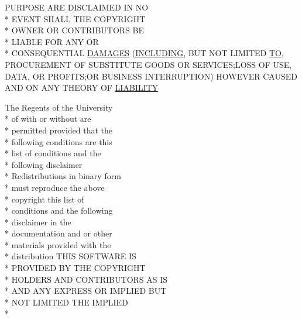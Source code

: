 \begin{DoxyCompactItemize}
P\+U\+R\+P\+O\+S\+E A\+R\+E D\+I\+S\+C\+L\+A\+I\+M\+E\+D I\+N N\+O \\*
E\+V\+E\+N\+T S\+H\+A\+L\+L T\+H\+E C\+O\+P\+Y\+R\+I\+G\+H\+T \\*
O\+W\+N\+E\+R O\+R C\+O\+N\+T\+R\+I\+B\+U\+T\+O\+R\+S B\+E \\*
L\+I\+A\+B\+L\+E F\+O\+R A\+N\+Y O\+R \\*
C\+O\+N\+S\+E\+Q\+U\+E\+N\+T\+I\+A\+L \hyperlink{_l_i_c_e_n_s_e_a71368e1362f00dad6d2fdb550f345070}{D\+A\+M\+A\+G\+E\+S} (\hyperlink{_l_i_c_e_n_s_e_a4cc4ede62f5367a5ba66dc92278c86dc}{I\+N\+C\+L\+U\+D\+I\+N\+G}, B\+U\+T N\+O\+T L\+I\+M\+I\+T\+E\+D \hyperlink{_l_i_c_e_n_s_e_a57f5e47bdbaa2a03fa7895d50ba5e2d3}{T\+O}, P\+R\+O\+C\+U\+R\+E\+M\+E\+N\+T O\+F S\+U\+B\+S\+T\+I\+T\+U\+T\+E G\+O\+O\+D\+S O\+R S\+E\+R\+V\+I\+C\+E\+S;L\+O\+S\+S O\+F U\+S\+E, D\+A\+T\+A, O\+R P\+R\+O\+F\+I\+T\+S;O\+R B\+U\+S\+I\+N\+E\+S\+S I\+N\+T\+E\+R\+R\+U\+P\+T\+I\+O\+N) H\+O\+W\+E\+V\+E\+R C\+A\+U\+S\+E\+D A\+N\+D O\+N A\+N\+Y T\+H\+E\+O\+R\+Y O\+F \hyperlink{_l_i_c_e_n_s_e_a75e09f34e85911710a689d696b2b04ac}{L\+I\+A\+B\+I\+L\+I\+T\+Y}
\item 
The Regents of the University \\*
of with or without are \\*
permitted provided that the \\*
following conditions are this \\*
list of conditions and the \\*
following disclaimer \\*
Redistributions in binary form \\*
must reproduce the above \\*
copyright this list of \\*
conditions and the following \\*
disclaimer in the \\*
documentation and or other \\*
materials provided with the \\*
distribution T\+H\+I\+S S\+O\+F\+T\+W\+A\+R\+E I\+S \\*
P\+R\+O\+V\+I\+D\+E\+D B\+Y T\+H\+E C\+O\+P\+Y\+R\+I\+G\+H\+T \\*
H\+O\+L\+D\+E\+R\+S A\+N\+D C\+O\+N\+T\+R\+I\+B\+U\+T\+O\+R\+S A\+S I\+S \\*
A\+N\+D A\+N\+Y E\+X\+P\+R\+E\+S\+S O\+R I\+M\+P\+L\+I\+E\+D B\+U\+T \\*
N\+O\+T L\+I\+M\+I\+T\+E\+D T\+H\+E I\+M\+P\+L\+I\+E\+D \\*

\end{DoxyCompactItemize}
